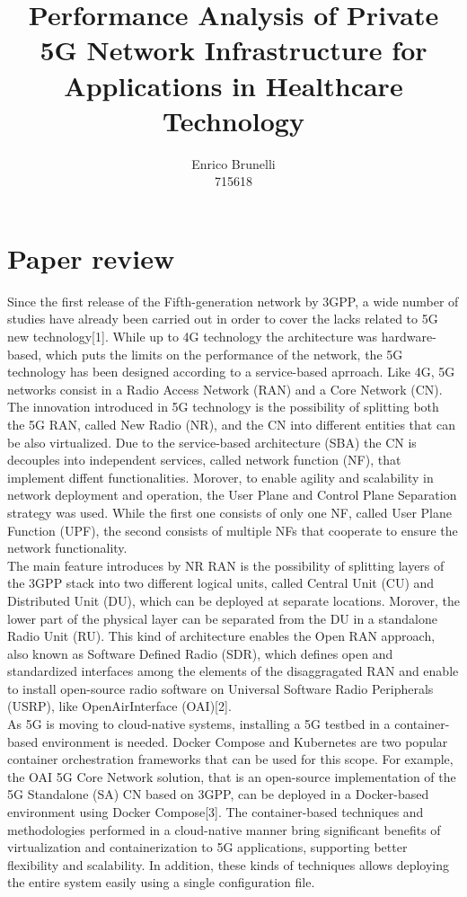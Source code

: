 \documentclass{report}
\author{Enrico Brunelli\\715618}
\title{Performance Analysis of Private 5G Network Infrastructure for Applications in Healthcare Technology}
\date{}
\begin{document}
	\maketitle
	\tableofcontents
\chapter{Paper review}
Since the first release of the Fifth-generation network by 3GPP, a wide number of studies have already been carried out in order to cover the lacks related to 5G new technology[1]. While up to 4G technology the architecture was hardware-based, which puts the limits on the performance of the network, the 5G technology has been designed according to a service-based aprroach. Like 4G, 5G networks consist in a Radio Access Network (RAN) and a Core Network (CN). The innovation introduced in 5G technology is the possibility of splitting both the 5G RAN, called New Radio (NR), and the CN into different entities that can be also virtualized. Due to the service-based architecture (SBA) the CN is decouples into independent services, called network function (NF), that implement diffent functionalities. Morover, to enable agility and scalability in network deployment and operation, the User Plane and Control Plane Separation strategy was used. While the first one consists of only one NF, called User Plane Function (UPF), the second consists of multiple NFs that cooperate to ensure the network functionality. \\
The main feature introduces by NR RAN is the possibility of splitting layers of the 3GPP stack into two different logical units, called Central Unit (CU) and Distributed Unit (DU), which can be deployed at separate locations. Morover, the lower part of the physical layer can be separated from the DU in a standalone Radio Unit (RU). This kind of architecture enables the Open RAN approach, also known as Software Defined Radio (SDR), which defines open and standardized interfaces among the elements of the disaggragated RAN and enable to install open-source radio software on Universal Software Radio Peripherals (USRP), like OpenAirInterface (OAI)[2]. \\
As 5G is moving to cloud-native systems, installing a 5G testbed in a container-based environment is needed. Docker Compose and Kubernetes are two popular container orchestration frameworks that can be used for this scope. For example, the OAI 5G Core Network solution, that is an open-source implementation of the 5G Standalone (SA) CN based on 3GPP, can be deployed in a Docker-based environment using Docker Compose[3]. The container-based techniques and methodologies performed in a cloud-native manner bring significant benefits of virtualization and containerization to 5G applications, supporting better flexibility and scalability. In addition, these kinds of techniques allows deploying the entire system easily using a single configuration file.\\
\end{document}
